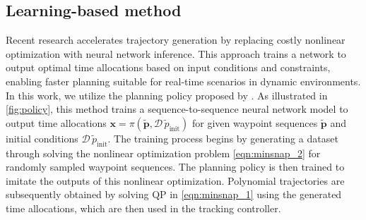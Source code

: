 \subsection{Learning-based method}

Recent research accelerates trajectory generation by replacing costly nonlinear optimization with neural network inference. 
This approach trains a network to output optimal time allocations based on input conditions and constraints, enabling faster planning suitable for real-time scenarios in dynamic environments. 
In this work, we utilize the planning policy proposed by \cite{ryou2024multi}. 
As illustrated in \cref{fig:policy}, this method trains a sequence-to-sequence neural network model to output time allocations $\mathbf{x} = \pi (\tilde{\mathbf{p}}, \mathcal{D\,} \tilde p_{\text{init}})$ for given waypoint sequences $\tilde{\mathbf{p}}$ and initial conditions $\mathcal{D\,}\tilde{p}_{\text{init}}$.
The training process begins by generating a dataset through solving the nonlinear optimization problem \eqref{eqn:minsnap_2} for randomly sampled waypoint sequences.
The planning policy is then trained to imitate the outputs of this nonlinear optimization. 
Polynomial trajectories are subsequently obtained by solving QP in \eqref{eqn:minsnap_1} using the generated time allocations, which are then used in the tracking controller.

